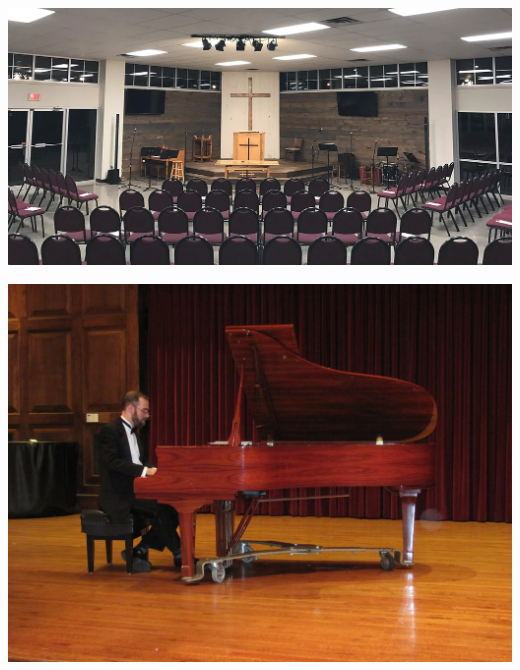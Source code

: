 \documentclass[xcolor={usenames,dvipsnames,svgnames,table},12pt]{beamer}
\begin{document}
\begin{frame}{}
  \begin{center}
    \includegraphics[width=\textwidth]{ccc-dark.jpg}
  \end{center}
\end{frame}

\begin{frame}{}
  \begin{center}
    \includegraphics[width=\textwidth]{brent-piano-concert.jpg}
  \end{center}
\end{frame}
\end{document}
